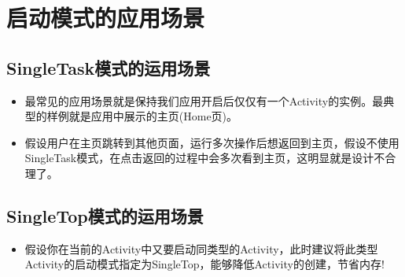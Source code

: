 \documentclass[9pt, b5paaper]{book}
\begin{document}
\section{启动模式的应用场景}
\label{sec-4-10}
\subsection{SingleTask模式的运用场景}
\label{sec-4-10-1}
\begin{itemize}
\item 最常见的应用场景就是保持我们应用开启后仅仅有一个Activity的实例。最典型的样例就是应用中展示的主页(Home页)。
\item 假设用户在主页跳转到其他页面，运行多次操作后想返回到主页，假设不使用SingleTask模式，在点击返回的过程中会多次看到主页，这明显就是设计不合理了。
\end{itemize}
\subsection{SingleTop模式的运用场景}
\label{sec-4-10-2}
\begin{itemize}
\item 假设你在当前的Activity中又要启动同类型的Activity，此时建议将此类型Activity的启动模式指定为SingleTop，能够降低Activity的创建，节省内存!
\end{itemize}
\end{document}
